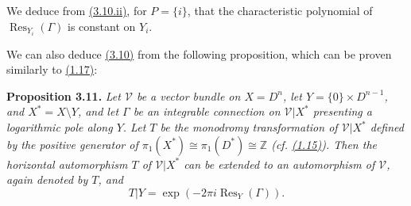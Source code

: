 \documentclass{report}
\newenvironment{itenv}[1]
  {\phantomsection\par\medskip\noindent\textbf{#1.}\itshape}
  {\par\medskip}
\renewcommand{\cal}[1]{{\mathcal{#1}}}
\newcommand{\ZZ}{\mathbb{Z}}
\DeclareMathOperator{\Res}{Res}
\begin{document}
We deduce from \hyperref[II.3.10]{(3.10.ii)}, for $P=\{i\}$, that the characteristic polynomial of $\Res_{Y_i}(\Gamma)$ is constant on $Y_i$.

We can also deduce \hyperref[II.3.10]{(3.10)} from the following proposition, which can be proven similarly to \hyperref[II.1.17]{(1.17)}:

\begin{itenv}{Proposition 3.11}
\label{II.3.11}
  Let $\cal{V}$ be a vector bundle on $X=D^n$, let $Y=\{0\}\times D^{n-1}$, and $X^*=X\setminus Y$, and let $\Gamma$ be an integrable connection on $\cal{V}|X^*$ presenting a logarithmic pole along $Y$.
  Let $T$ be the monodromy transformation of $\cal{V}|X^*$ defined by the positive generator of $\pi_1(X^*)\cong\pi_1(D^*)\cong\ZZ$ (cf. \hyperref[II.1.15]{(1.15)}).
  Then the horizontal automorphism $T$ of $\cal{V}|X^*$ can be extended to an automorphism of $\cal{V}$, again denoted by $T$, and
  \[
    T|Y = \exp(-2\pi i\Res_Y(\Gamma)).
  \]
\end{itenv}
\end{document}
